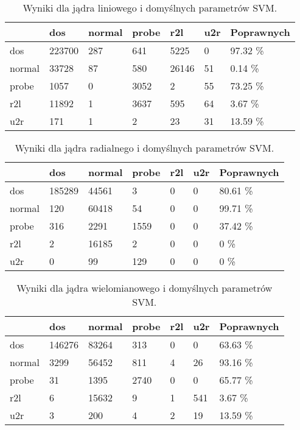 \documentclass[a4paper, 12pt]{article}
\begin{document}
\begin{table}[H]
\centering
\caption{Wyniki dla jądra liniowego i domyślnych parametrów SVM.}
\label{table:cm_svm_linear_default}
\begin{tabular}{ | l | l | l | l | l | l | l | } \hline
	& dos & normal &  probe  &  r2l  &  u2r 	& Poprawnych	\\ \hline
  dos    & 223700  &  287  &  641  &  5225   &   0  & 97.32 \% \\ \hline
  normal &  33728  &   87  &  580  &  26146  &   51 & 0.14 \% \\ \hline
  probe  &   1057  &    0  &  3052 &     2   &  55  & 73.25 \% \\ \hline
  r2l    &  11892  &    1  &  3637 &   595   &  64  & 3.67 \% \\ \hline
  u2r    &   171  &    1  &    2  &   23    &  31  & 13.59 \% \\ \hline
\end{tabular} 
\end{table}

\begin{table}[H]
\centering
\caption{Wyniki dla jądra radialnego i domyślnych parametrów SVM.}
\label{table:cm_svm_radial_default}
\begin{tabular}{ | l | l | l | l | l | l | l | } \hline
	& dos & normal &  probe  &  r2l  &  u2r 	& Poprawnych	\\ \hline
  dos    & 185289  &  44561  &    3  &    0  &    0  & 80.61 \% \\ \hline
  normal & 120 &  60418  &   54  &    0  &    0 & 99.71 \% \\ \hline
  probe  &   316  &  2291 &  1559  &    0  &    0  & 37.42 \% \\ \hline
  r2l    &  2  & 16185  &    2   &   0   &   0  & 0 \% \\ \hline
  u2r    &   0    &  99   &  129   &   0     &  0 & 0 \% \\ \hline
\end{tabular} 
\end{table}

\begin{table}[H]
\centering
\caption{Wyniki dla jądra wielomianowego i domyślnych parametrów SVM.}
\label{table:cm_svm_poly_default}
\begin{tabular}{ | l | l | l | l | l | l | l | } \hline
	& dos & normal &  probe  &  r2l  &  u2r 	& Poprawnych	\\ \hline
  dos    & 146276  & 83264  &   313  &    0   &   0  & 63.63 \% \\ \hline
  normal &  3299 &  56452 &   811  &    4   &  26 & 93.16 \% \\ \hline
  probe  &   31  &  1395  &  2740  &     0  &    0  & 65.77 \% \\ \hline
  r2l    &  6    & 15632  &    9  &    1   &  541  & 3.67 \% \\ \hline
  u2r    &   3   &  200   &   4  &    2   &  19  & 13.59 \% \\ \hline
\end{tabular} 
\end{table}
\end{document}
